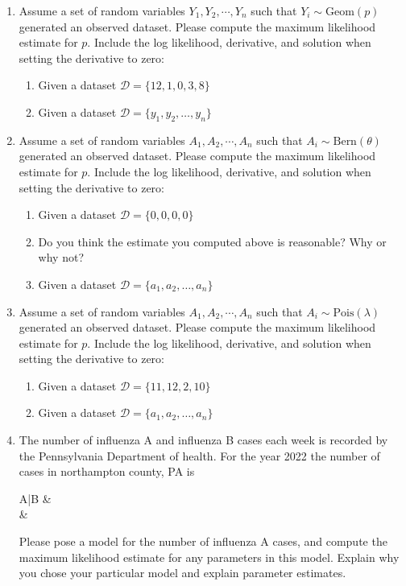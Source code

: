 \begin{enumerate}
    \item  Assume a set of random variables $Y_{1}, Y_{2}, \cdots, Y_{n}$ such that $Y_{i} \sim \text{Geom}(p)$ generated an observed dataset. Please compute the maximum likelihood estimate for $p$. Include the log likelihood, derivative, and solution when setting the derivative to zero: 
    \begin{enumerate}
        \item Given a dataset $\mathcal{D} = \{ 12, 1, 0, 3, 8  \}$
        \item Given a dataset $\mathcal{D} = \{y_{1}, y_{2}, \dots, y_{n}\}$
    \end{enumerate}
    
    \item Assume a set of random variables $A_{1}, A_{2}, \cdots, A_{n}$ such that $A_{i} \sim \text{Bern}(\theta)$ generated an observed dataset. Please compute the maximum likelihood estimate for $p$. Include the log likelihood, derivative, and solution when setting the derivative to zero: 
    \begin{enumerate}
        \item Given a dataset $\mathcal{D} = \{ 0,0,0,0 \}$
        \item Do you think the estimate you computed above is reasonable? Why or why not?
        \item Given a dataset $\mathcal{D} = \{a_{1}, a_{2}, \dots, a_{n}\}$
    \end{enumerate}
    
    \item Assume a set of random variables $A_{1}, A_{2}, \cdots, A_{n}$ such that $A_{i} \sim \text{Pois}(\lambda)$ generated an observed dataset. Please compute the maximum likelihood estimate for $p$. Include the log likelihood, derivative, and solution when setting the derivative to zero: 
    \begin{enumerate}
        \item Given a dataset $\mathcal{D} = \{ 11,12,2,10 \}$
        \item Given a dataset $\mathcal{D} = \{a_{1}, a_{2}, \dots, a_{n}\}$
    \end{enumerate}
    
    \item The number of influenza A and influenza B cases each week is recorded by the Pennsylvania Department of health. 
    For the year 2022 the number of cases in northampton county, PA is 
    \begin{table}[]
        \centering
        \begin{tabular}{A|B}
             &  \\
             & 
        \end{tabular}
        \caption{Caption}
        \label{tab:my_label}
    \end{table}
    Please pose a model for the number of influenza A cases, and compute the maximum likelihood estimate for any parameters in this model. Explain why you chose your particular model and explain parameter estimates.
    
    
\end{enumerate}




